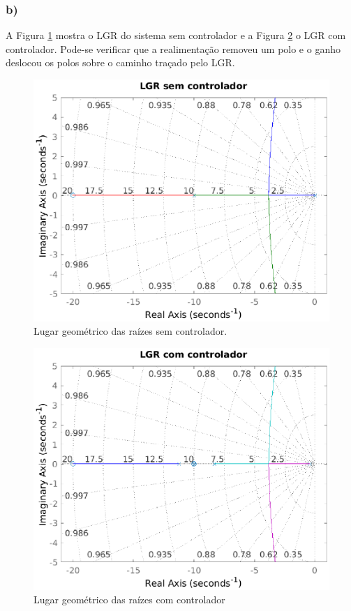 \newpage
\subsubsection*{b)}

    A Figura \ref{fig:LGR3Bsem} mostra o LGR do sistema sem controlador e a Figura \ref{fig:LGR3Bcom} o 
    LGR com controlador. Pode-se verificar que a realimentação removeu um polo e o ganho deslocou os polos 
    sobre o caminho traçado pelo LGR.


    \begin{figure}[!ht]
        \centering
        \includegraphics[width = 0.75\linewidth]{Figuras/ProblemasPI/Problema3/LGRsemControlador.eps}
        \caption{Lugar geométrico das raízes sem controlador.}
        \label{fig:LGR3Bsem}                   
    \end{figure}

    \begin{figure}[!ht]
        \centering
        \includegraphics[width = 0.75\linewidth]{Figuras/ProblemasPI/Problema3/LGRcomControlador.eps}
        \caption{Lugar geométrico das raízes com controlador}
        \label{fig:LGR3Bcom}                   
    \end{figure}


